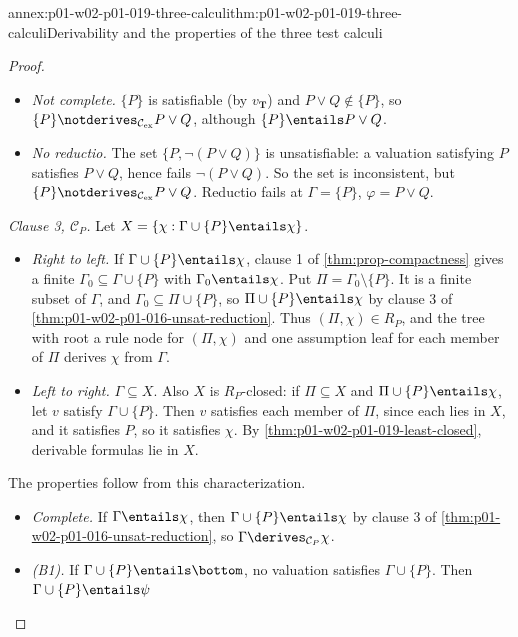 \begin{annexitem}{annex:p01-w02-p01-019-three-calculi}{thm:p01-w02-p01-019-three-calculi}{Derivability and the properties of the three test calculi}
\begin{proof}
\begin{itemize}
  \item \emph{Not complete.} \(\{P\}\) is satisfiable (by
        \(v_{\mathbf T}\)) and \(P\lor Q\notin\{P\}\), so
        \(\{P\}\notderives_{\mathcal C_{\mathrm{ex}}}P\lor Q\), although
        \(\{P\}\entails P\lor Q\).
  \item \emph{No reductio.} The set \(\{P,\neg(P\lor Q)\}\) is
        unsatisfiable: a valuation satisfying \(P\) satisfies \(P\lor Q\),
        hence fails \(\neg(P\lor Q)\). So the set is inconsistent, but
        \(\{P\}\notderives_{\mathcal C_{\mathrm{ex}}}P\lor Q\). Reductio
        fails at \(\Gamma=\{P\}\), \(\varphi=P\lor Q\).
\end{itemize}

\emph{Clause 3, \(\mathcal C_P\).} Let
\(X=\{\chi:\Gamma\cup\{P\}\entails\chi\}\).
\begin{itemize}
  \item \emph{Right to left.} If \(\Gamma\cup\{P\}\entails\chi\), clause 1
        of \cref{thm:prop-compactness} gives a finite
        \(\Gamma_0\subseteq\Gamma\cup\{P\}\) with \(\Gamma_0\entails\chi\).
        Put \(\Pi=\Gamma_0\setminus\{P\}\). It is a finite subset of
        \(\Gamma\), and \(\Gamma_0\subseteq\Pi\cup\{P\}\), so
        \(\Pi\cup\{P\}\entails\chi\) by clause 3 of
        \cref{thm:p01-w02-p01-016-unsat-reduction}. Thus
        \((\Pi,\chi)\in R_P\), and the tree with root a rule node for
        \((\Pi,\chi)\) and one assumption leaf for each member of \(\Pi\)
        derives \(\chi\) from \(\Gamma\).
  \item \emph{Left to right.} \(\Gamma\subseteq X\). Also \(X\) is
        \(R_P\)-closed: if \(\Pi\subseteq X\) and
        \(\Pi\cup\{P\}\entails\chi\), let \(v\) satisfy \(\Gamma\cup\{P\}\).
        Then \(v\) satisfies each member of \(\Pi\), since each lies in
        \(X\), and it satisfies \(P\), so it satisfies \(\chi\). By
        \cref{thm:p01-w02-p01-019-least-closed}, derivable formulas lie in
        \(X\).
\end{itemize}
The properties follow from this characterization.
\begin{itemize}
  \item \emph{Complete.} If \(\Gamma\entails\chi\), then
        \(\Gamma\cup\{P\}\entails\chi\) by clause 3 of
        \cref{thm:p01-w02-p01-016-unsat-reduction}, so
        \(\Gamma\derives_{\mathcal C_P}\chi\).
  \item \emph{(B1).} If \(\Gamma\cup\{P\}\entails\bottom\), no valuation
        satisfies \(\Gamma\cup\{P\}\). Then \(\Gamma\cup\{P\}\entails\psi\)

\end{itemize}
\end{proof}
\end{annexitem}
